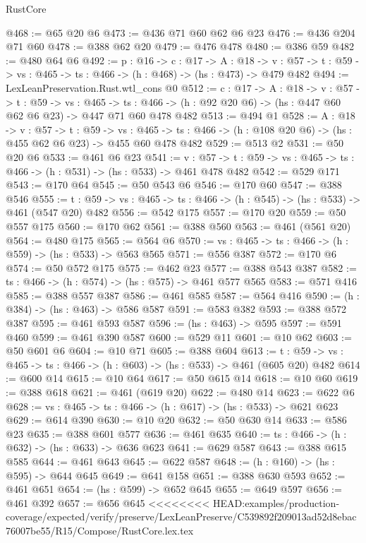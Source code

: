 \begin{lexlean}{RustCore}
\begin{coremodule}
{\begin{coremodule}
@468 := @65 @20 @6
@473 := @436 @71 @60 @62 @6 @23
@476 := @436 @204 @71 @60
@478 := @388 @62 @20
@479 := @476 @478
@480 := @386 @59
@482 := @480 @64 @6
@492 := {p : @16} ->
  {c : @17} ->
  {A : @18} ->
  {v : @57} -> {t : @59} -> {vs : @465} -> {ts : @466} -> (h : @468) -> (hs : @473) -> @479 @482
@494 := LexLeanPreservation.Rust.wtl_cons @0
@512 := {c : @17} ->
  {A : @18} ->
  {v : @57} ->
  {t : @59} ->
  {vs : @465} ->
  {ts : @466} -> (h : @92 @20 @6) -> (hs : @447 @60 @62 @6 @23) -> @447 @71 @60 @478 @482
@513 := @494 @1
@528 := {A : @18} ->
  {v : @57} ->
  {t : @59} ->
  {vs : @465} -> {ts : @466} -> (h : @108 @20 @6) -> (hs : @455 @62 @6 @23) -> @455 @60 @478 @482
@529 := @513 @2
@531 := @50 @20 @6
@533 := @461 @6 @23
@541 := {v : @57} ->
  {t : @59} -> {vs : @465} -> {ts : @466} -> (h : @531) -> (hs : @533) -> @461 @478 @482
@542 := @529 @171
@543 := @170 @64
@545 := @50 @543 @6
@546 := @170 @60
@547 := @388 @546
@555 := {t : @59} -> {vs : @465} -> {ts : @466} -> (h : @545) -> (hs : @533) -> @461 (@547 @20) @482
@556 := @542 @175
@557 := @170 @20
@559 := @50 @557 @175
@560 := @170 @62
@561 := @388 @560
@563 := @461 (@561 @20)
@564 := @480 @175
@565 := @564 @6
@570 := {vs : @465} -> {ts : @466} -> (h : @559) -> (hs : @533) -> @563 @565
@571 := @556 @387
@572 := @170 @6
@574 := @50 @572 @175
@575 := @462 @23
@577 := @388 @543 @387
@582 := {ts : @466} -> (h : @574) -> (hs : @575) -> @461 @577 @565
@583 := @571 @416
@585 := @388 @557 @387
@586 := @461 @585
@587 := @564 @416
@590 := (h : @384) -> (hs : @463) -> @586 @587
@591 := @583 @382
@593 := @388 @572 @387
@595 := @461 @593 @587
@596 := (hs : @463) -> @595
@597 := @591 @460
@599 := @461 @390 @587
@600 := @529 @11
@601 := @10 @62
@603 := @50 @601 @6
@604 := @10 @71
@605 := @388 @604
@613 := {t : @59} -> {vs : @465} -> {ts : @466} -> (h : @603) -> (hs : @533) -> @461 (@605 @20) @482
@614 := @600 @14
@615 := @10 @64
@617 := @50 @615 @14
@618 := @10 @60
@619 := @388 @618
@621 := @461 (@619 @20)
@622 := @480 @14
@623 := @622 @6
@628 := {vs : @465} -> {ts : @466} -> (h : @617) -> (hs : @533) -> @621 @623
@629 := @614 @390
@630 := @10 @20
@632 := @50 @630 @14
@633 := @586 @23
@635 := @388 @601 @577
@636 := @461 @635
@640 := {ts : @466} -> (h : @632) -> (hs : @633) -> @636 @623
@641 := @629 @587
@643 := @388 @615 @585
@644 := @461 @643
@645 := @622 @587
@648 := (h : @160) -> (hs : @595) -> @644 @645
@649 := @641 @158
@651 := @388 @630 @593
@652 := @461 @651
@654 := (hs : @599) -> @652 @645
@655 := @649 @597
@656 := @461 @392
@657 := @656 @645
<<<<<<<< HEAD:examples/production-coverage/expected/verify/preserve/LexLeanPreserve/C539892f209013ad52d8ebac76007be55/R15/Compose/RustCore.lex.tex

\end{coremodule}}
\end{coremodule}
\end{lexlean}

